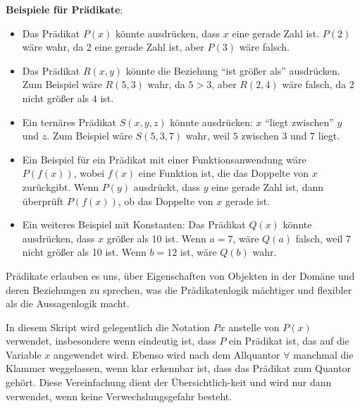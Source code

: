 \documentclass[main.tex]{subfiles}
\begin{document}
\begin{definition}[Prädikat]
\textbf{Beispiele für Prädikate}:
\begin{itemize}
    \item Das Prädikat \(P(x)\) könnte ausdrücken, dass \(x\) eine gerade Zahl ist. \(P(2)\) wäre wahr, da 2 eine gerade Zahl ist, aber \(P(3)\) wäre falsch.
    \item Das Prädikat \(R(x, y)\) könnte die Beziehung \enquote{ist größer als} ausdrücken. Zum Beispiel wäre \(R(5, 3)\) wahr, da \(5 > 3\), aber \(R(2, 4)\) wäre falsch, da \(2\) nicht größer als \(4\) ist.
    \item Ein ternäres Prädikat \(S(x, y, z)\) könnte ausdrücken: \(x\) \enquote{liegt zwischen} \(y\) und \(z\). Zum Beispiel wäre \(S(5, 3, 7)\) wahr, weil \(5\) zwischen \(3\) und \(7\) liegt.
    \item Ein Beispiel für ein Prädikat mit einer Funktionsanwendung wäre \(P(f(x))\), wobei \(f(x)\) eine Funktion ist, die das Doppelte von \(x\) zurückgibt. Wenn \(P(y)\) ausdrückt, dass \(y\) eine gerade Zahl ist, dann überprüft \(P(f(x))\), ob das Doppelte von \(x\) gerade ist.
    \item Ein weiteres Beispiel mit Konstanten: Das Prädikat \(Q(x)\) könnte ausdrücken, dass \(x\) größer als 10 ist. Wenn \(a = 7\), wäre \(Q(a)\) falsch, weil 7 nicht größer als 10 ist. Wenn \(b = 12\) ist, wäre \(Q(b)\) wahr.
\end{itemize}

Prädikate erlauben es uns, über Eigenschaften von Objekten in der Domäne und deren Beziehungen zu sprechen, was die Prädikatenlogik mächtiger und flexibler als die Aussagenlogik macht.
\end{definition}
\begin{remark}
In diesem Skript wird gelegentlich die Notation \(Px\) anstelle von \(P(x)\) verwendet, insbesondere wenn eindeutig ist, dass \(P\) ein Prädikat ist, das auf die Variable \(x\) angewendet wird. Ebenso wird nach dem Allquantor \(\forall\) manchmal die Klammer weggelassen, wenn klar erkennbar ist, dass das Prädikat zum Quantor gehört. Diese Vereinfachung dient der Übersichtlich-keit und wird nur dann verwendet, wenn keine Verwechslungsgefahr besteht.
\end{remark}
\end{document}
